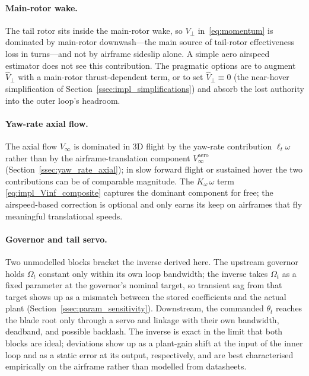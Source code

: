 \documentclass[11pt,a4paper]{article}
\newcommand{\OmegaT}{\Omega_t}
\newcommand{\thetat}{\theta_t}
\begin{document}
\paragraph{Main-rotor wake.}
The tail rotor sits inside the main-rotor wake, so \(V_\perp\)
in~\eqref{eq:momentum} is dominated by main-rotor downwash---the main
source of tail-rotor effectiveness loss in turns---and not by airframe
sideslip alone. A simple aero airspeed estimator does not see this
contribution. The pragmatic options are to augment \(\hat V_\perp\)
with a main-rotor thrust-dependent term, or to set
\(\hat V_\perp\equiv 0\) (the near-hover simplification of
Section~\ref{ssec:impl_simplifications}) and absorb the lost authority
into the outer loop's headroom.

\paragraph{Yaw-rate axial flow.}
The axial flow \(V_\infty\) is dominated in 3D flight by the yaw-rate
contribution \(\ell_t\omega\) rather than by the airframe-translation
component \(V_\infty^{\text{aero}}\)
(Section~\ref{ssec:yaw_rate_axial}); in slow forward flight or
sustained hover the two contributions can be of comparable magnitude.
The \(K_\omega\,\omega\) term \eqref{eq:impl_Vinf_composite} captures the
dominant component for free; the airspeed-based correction is optional
and only earns its keep on airframes that fly meaningful translational
speeds.

\paragraph{Governor and tail servo.}
Two unmodelled blocks bracket the inverse derived here. The upstream
governor holds \(\OmegaT\) constant only within its own loop
bandwidth; the inverse takes \(\OmegaT\) as a fixed parameter at the
governor's nominal target, so transient sag from that target shows up
as a mismatch between the stored coefficients and the actual plant
(Section~\ref{ssec:param_sensitivity}). Downstream, the
commanded \(\thetat\) reaches the blade root only through a servo and
linkage with their own bandwidth, deadband, and possible backlash. The
inverse is exact in the limit that both blocks are ideal; deviations
show up as a plant-gain shift at the input of the inner loop and as a
static error at its output, respectively, and are best characterised
empirically on the airframe rather than modelled from datasheets.

\appendix
\end{document}
